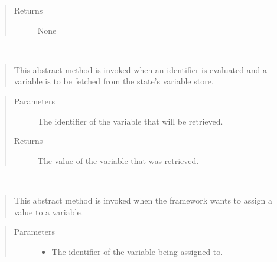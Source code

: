 \documentclass[letterpaper,10pt,english]{sphinxmanual}
\begin{document}
\begin{fulllineitems}
\begin{fulllineitems}
\begin{quote}
\begin{description}
\item[{Returns}] \leavevmode
\sphinxAtStartPar
None

\end{description}\end{quote}

\end{fulllineitems}


\begin{fulllineitems}
\label{\detokenize{index:State.State.load_variable}}~\begin{quote}

\sphinxAtStartPar
This abstract method is invoked when an identifier is evaluated and a variable is
to be fetched from the state’s variable store.
\end{quote}
\begin{quote}\begin{description}
\item[{Parameters}] \leavevmode
\sphinxAtStartPar
{} \textendash{} The identifier of the variable that will be retrieved.

\item[{Returns}] \leavevmode
\sphinxAtStartPar
The value of the variable that was retrieved.

\end{description}\end{quote}

\end{fulllineitems}


\begin{fulllineitems}
\label{\detokenize{index:State.State.store_variable}}~\begin{quote}

\sphinxAtStartPar
This abstract method is invoked when the framework wants to assign a value to a variable.
\end{quote}
\begin{quote}\begin{description}
\item[{Parameters}] \leavevmode\begin{itemize}
\item {} 
\sphinxAtStartPar
{} \textendash{} The identifier of the variable being assigned to.


\end{itemize}
\end{description}
\end{quote}
\end{fulllineitems}
\end{fulllineitems}
\end{document}
